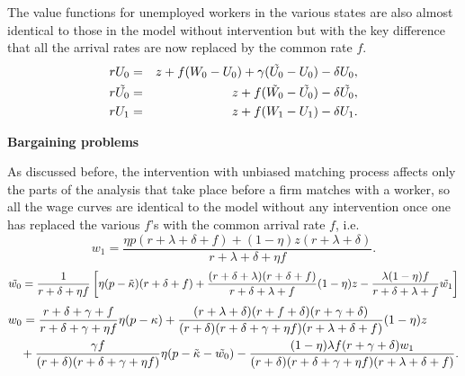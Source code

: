 \documentclass[12pt]{article} %
\theoremstyle{definition}
\begin{document}
The value functions for unemployed workers in the various states are also almost identical to those in the model without intervention but with the key difference that all the arrival rates are now replaced by the common rate $f$.
\begin{eqnarray*}
    rU_0 &=& z+f(W_0-U_0)+\gamma(\Tilde{U_0}-U_0) - \delta U_0, \\
    r\Tilde{U_0} &=& z+f(\Tilde{W_0}-\Tilde{U_0})- \delta \Tilde{U_0}, \\
    rU_1 &=& z+f(W_1-U_1)- \delta U_1.
\end{eqnarray*}

\smallskip 

\noindent \textbf{Bargaining problems}

\noindent As discussed before, the intervention with unbiased matching process affects only the parts of the analysis that take place before a firm matches with a worker, so all the wage curves are identical to the model without any intervention once one has replaced the various $f$'s with the common arrival rate $f$, i.e.  
\begin{equation}
 w_1 = \frac{\eta p (r+\lambda+\delta+f)+(1-\eta)z(r+\lambda+\delta)}{r+\lambda+\delta + \eta f}. \label{eq WC1 inter 1 no scar}
\end{equation}
\begin{equation} 
\Tilde{w_0} = \frac{1}{r+\delta+\eta {f}}\left[\eta(p-\Tilde{\kappa})(r+\delta+ {f})+\frac{(r+\delta+\lambda)(r+\delta+{f})}{r+\delta+\lambda+{f}}(1-\eta)z - \frac{\lambda(1-\eta){f}}{r+\delta+\lambda+{f}}\Tilde{w_1} \right] \label{eq WC0 tilde inter 1 no scar}
\end{equation}
\begin{equation}
    \begin{multlined}
         w_0 = \frac{r+\delta+\gamma +f}{r+\delta+\gamma+\eta f}\eta (p-\kappa) + \frac{(r+\lambda+\delta)(r+f+\delta)(r+\gamma+\delta)}{(r+\delta)(r+\delta+\gamma + \eta f)(r+\lambda+\delta+f)} (1-\eta) z \label{eq WC0 inter 1} \\  
+ \frac{\gamma {f}}{(r+\delta)(r+\delta+\gamma + \eta f)}\eta(p-\Tilde{\kappa}-\Tilde{w_0}) - \frac{(1-\eta)\lambda f (r+\gamma+\delta)w_1}{(r+\delta)(r+\delta+\gamma + \eta f)(r+\lambda+\delta+f)}.
    \end{multlined} \label{eq WC0 inter 1 no scar}
\end{equation}

\bigskip 
\end{document}
